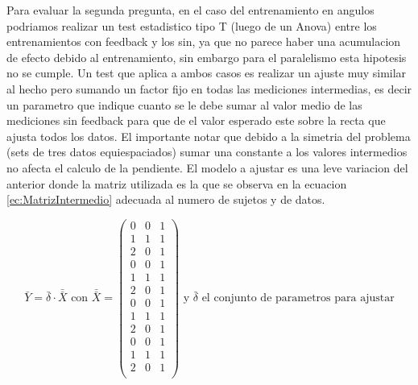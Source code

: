 \documentclass{article}
\begin{document}
Para evaluar la segunda pregunta, en el caso del entrenamiento en angulos podriamos realizar un test estadistico tipo T (luego de un Anova) entre los entrenamientos con feedback y los sin, ya que no parece haber una acumulacion de efecto debido al entrenamiento, sin embargo para el paralelismo esta hipotesis no se cumple. Un test que aplica a ambos casos es realizar un ajuste muy similar al hecho pero sumando un factor fijo en todas las mediciones intermedias, es decir un parametro que indique cuanto se le debe sumar al valor medio de las mediciones sin feedback para que de el valor esperado este sobre la recta que ajusta todos los datos. El importante notar que debido a la simetria del problema (sets de tres datos equiespaciados) sumar una constante a los valores intermedios no afecta el calculo de la pendiente. El modelo a ajustar es una leve variacion del anterior donde la matriz utilizada es la que se observa en la ecuacion \ref{ec:MatrizIntermedio} adecuada al numero de sujetos y de datos.

\begin{equation} \label{ec:MatrizIntermedio}
    \bar {Y} = \bar{\delta} \cdot \bar{\bar{X}} \text{ con } \bar{\bar{X}} =
     \begin{pmatrix}
        0 & 0 & 1\\
        1 & 1 & 1\\
        2 & 0 & 1\\
        0 & 0 & 1\\
        1 & 1 & 1\\
        2 & 0 & 1\\
        0 & 0 & 1\\
        1 & 1 & 1\\
        2 & 0 & 1\\
        0 & 0 & 1\\
        1 & 1 & 1\\
        2 & 0 & 1\\
     \end{pmatrix} \text{ y $\bar{\delta}$ el conjunto de parametros para ajustar}
 \end{equation}
 
\end{document}
